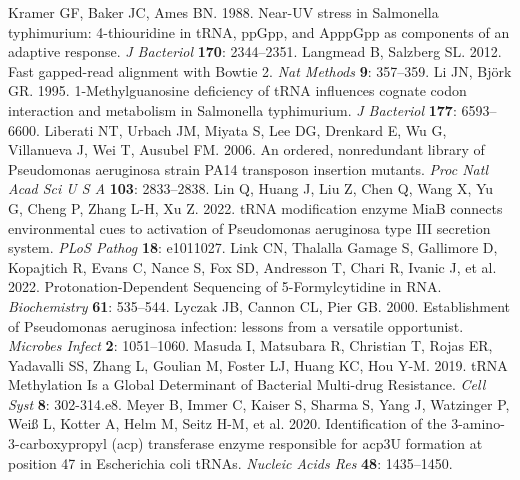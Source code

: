 \documentclass[times, twoside]{zHenriquesLab-StyleBioRxiv}
\begin{document}
\newline
\newline
Kramer GF, Baker JC, Ames BN. 1988. Near-UV stress in Salmonella typhimurium: 4-thiouridine in tRNA, ppGpp, and ApppGpp as components of an adaptive response. \textit{J Bacteriol} \textbf{170}: 2344–2351. 
\newline
\newline
Langmead B, Salzberg SL. 2012. Fast gapped-read alignment with Bowtie 2. \textit{Nat Methods} \textbf{9}: 357–359. 
\newline
\newline
Li JN, Björk GR. 1995. 1-Methylguanosine deficiency of tRNA influences cognate codon interaction and metabolism in Salmonella typhimurium. \textit{J Bacteriol} \textbf{177}: 6593–6600. 
\newline
\newline
Liberati NT, Urbach JM, Miyata S, Lee DG, Drenkard E, Wu G, Villanueva J, Wei T, Ausubel FM. 2006. An ordered, nonredundant library of Pseudomonas aeruginosa strain PA14 transposon insertion mutants. \textit{Proc Natl Acad Sci U S A} \textbf{103}: 2833–2838. 
\newline
\newline
Lin Q, Huang J, Liu Z, Chen Q, Wang X, Yu G, Cheng P, Zhang L-H, Xu Z. 2022. tRNA modification enzyme MiaB connects environmental cues to activation of Pseudomonas aeruginosa type III secretion system. \textit{PLoS Pathog} \textbf{18}: e1011027. 
\newline
\newline
Link CN, Thalalla Gamage S, Gallimore D, Kopajtich R, Evans C, Nance S, Fox SD, Andresson T, Chari R, Ivanic J, et al. 2022. Protonation-Dependent Sequencing of 5-Formylcytidine in RNA. \textit{Biochemistry} \textbf{61}: 535–544. 
\newline
\newline
Lyczak JB, Cannon CL, Pier GB. 2000. Establishment of Pseudomonas aeruginosa infection: lessons from a versatile opportunist. \textit{Microbes Infect} \textbf{2}: 1051–1060. 
\newline
\newline
Masuda I, Matsubara R, Christian T, Rojas ER, Yadavalli SS, Zhang L, Goulian M, Foster LJ, Huang KC, Hou Y-M. 2019. tRNA Methylation Is a Global Determinant of Bacterial Multi-drug Resistance. \textit{Cell Syst} \textbf{8}: 302-314.e8. 
\newline
\newline
Meyer B, Immer C, Kaiser S, Sharma S, Yang J, Watzinger P, Weiß L, Kotter A, Helm M, Seitz H-M, et al. 2020. Identification of the 3-amino-3-carboxypropyl (acp) transferase enzyme responsible for acp3U formation at position 47 in Escherichia coli tRNAs. \textit{Nucleic Acids Res} \textbf{48}: 1435–1450. 
\end{document}
